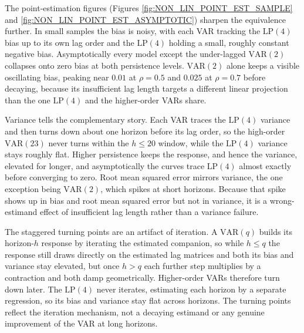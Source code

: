\newpage
The point-estimation figures (Figures \ref{fig:NON_LIN_POINT_EST_SAMPLE} and
\ref{fig:NON_LIN_POINT_EST_ASYMPTOTIC}) sharpen the equivalence further. In small samples the bias
is noisy, with each VAR tracking the $\text{LP}(4)$ bias up to its own lag order and the
$\text{LP}(4)$ holding a small, roughly constant negative bias. Asymptotically every model except
the under-lagged $\text{VAR}(2)$ collapses onto zero bias at both persistence levels.
$\text{VAR}(2)$ alone keeps a visible oscillating bias, peaking near $0.01$ at $\rho=0.5$ and
$0.025$ at $\rho=0.7$ before decaying, because its insufficient lag length targets a different
linear projection than the one $\text{LP}(4)$ and the higher-order VARs share.

Variance tells the complementary story. Each VAR traces the $\text{LP}(4)$ variance and then turns
down about one horizon before its lag order, so the high-order $\text{VAR}(23)$ never turns within
the $h \le 20$ window, while the $\text{LP}(4)$ variance stays roughly flat. Higher persistence
keeps the response, and hence the variance, elevated for longer, and asymptotically the curves
trace $\text{LP}(4)$ almost exactly before converging to zero. Root mean squared error mirrors
variance, the one exception being $\text{VAR}(2)$, which spikes at short horizons. Because that
spike shows up in bias and root mean squared error but not in variance, it is a wrong-estimand
effect of insufficient lag length rather than a variance failure.

The staggered turning points are an artifact of iteration. A $\text{VAR}(q)$ builds its
horizon-$h$ response by iterating the estimated companion, so while $h \le q$ the response still
draws directly on the estimated lag matrices and both its bias and variance stay elevated, but
once $h > q$ each further step multiplies by a contraction and both damp geometrically. Higher-order
VARs therefore turn down later. The $\text{LP}(4)$ never iterates, estimating each horizon by a
separate regression, so its bias and variance stay flat across horizons. The turning points
reflect the iteration mechanism, not a decaying estimand or any genuine improvement of the VAR at
long horizons.



